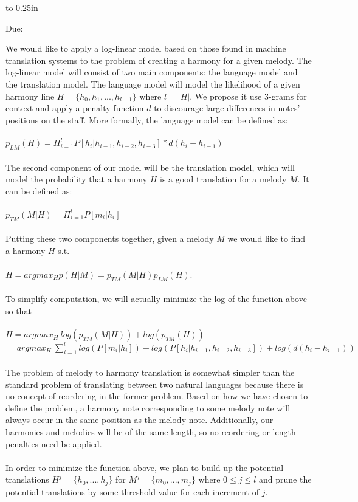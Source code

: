 \documentclass[letterpaper,12pt]{article}
\newcommand{\htitle}
{
    \vbox to 0.25in{}
    \noindent\parbox{\textwidth}
    {
        \student\hfill \assigndate\newline
        \coursename\hfill 
        Due: \duedate \vspace*{-.5ex}\newline
        \mbox{}\hrulefill\mbox{}
    }
    \vspace{8pt}
    \begin{center}{\Large\bf{\settitle}}\end{center}
}
\newcommand{\handout}
{
    \thispagestyle{empty}
    \markboth{}{}
    \pagestyle{plain}
    \htitle
}
\begin{document}
\handout
\setlength{\parindent}{0pt}

We would like to apply a log-linear model based on those found in machine translation systems to the problem of creating a harmony for a given melody. The log-linear model will consist of two main components: the language model and the translation model. The language model will model the likelihood of a  given harmony line $H = \{h_{0}, h_{1}, ... , h_{l - 1}\}$ where $l = |H|$. We propose it use 3-grams for context and apply a penalty function $d$ to discourage large differences in notes' positions on the staff. More formally, the language model can be defined as:\\
\\
$p_{LM}(H) = \Pi_{i = 1}^{l} P[h_{i} | h_{i - 1}, h_{i - 2}, h_{i - 3}]*d(h_{i} - h_{i - 1})$\\
\\
The second component of our model will be the translation model, which will model the probability that a harmony $H$ is a good translation for a melody $M$. It can be defined as:\\
\\
$p_{TM}(M | H) = \Pi_{i = 1}^{l} P[m_{i} | h_{i}]$\\
\\
Putting these two components together, given a melody $M$ we would like to find a harmony $H$ s.t.\\
\\
$H = argmax_{H}p(H | M) = p_{TM}(M | H)p_{LM}(H)$.\\
\\
To simplify computation, we will actually minimize the log of the function above so that\\
\\
$H = argmax_{H}\ log(p_{TM}(M | H)) + log(p_{TM}(H))$\\
$= argmax_{H}\ \sum_{i = 1}^{l} log(P[m_{i} | h_{i}]) + log(P[h_{i} | h_{i - 1}, h_{i - 2}, h_{i - 3}]) + log(d(h_{i} - h_{i - 1}))$\\
\\
The problem of melody to harmony translation is somewhat simpler than the standard problem of translating between two natural languages because there is no concept of reordering in the former problem. Based on how we have chosen to define the problem, a harmony note corresponding to some melody note will always occur in the same position as the melody note. Additionally, our harmonies and melodies will be of the same length, so no reordering or length penalties need be applied.\\
\\
In order to minimize the function above, we plan to build up the potential translations $H^{j} = \{h_{0}, ... , h_{j}\}$ for $M^{j} = \{m_{0}, ... , m_{j}\}$ where $0 \leq j \leq l$ and prune the potential translations by some threshold value for each increment of $j$.\\

\vfill
\end{document}
